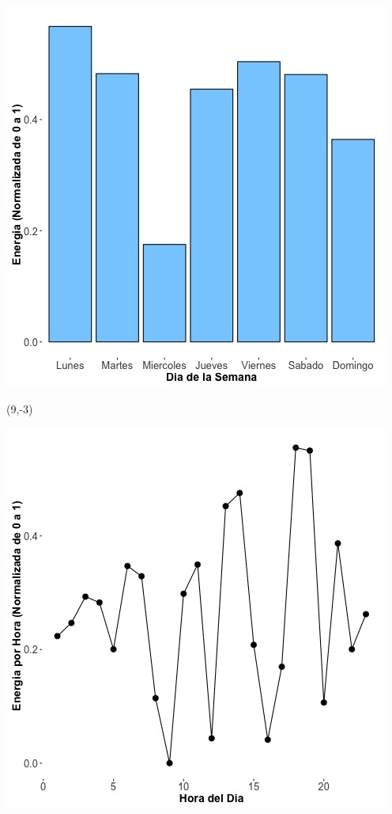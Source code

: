 \documentclass{article}\usepackage[]{graphicx}\usepackage[]{color}
\newenvironment{knitrout}{}{} %
\begin{document}
\begin{knitrout}
\color{fgcolor}
\includegraphics[scale=0.65]{figure/A3_day_of_week_plot} 
\end{knitrout}


 \begin{textblock}{1}(9,-3)
\begin{minipage}{20em}
\begingroup

\endgroup
\end{minipage}
\end{textblock}

 \vspace{2cm}

\begin{knitrout}
\color{fgcolor}
\includegraphics[scale=0.75]{figure/A3_fplot_norm_median} 
\end{knitrout}
\end{document}
